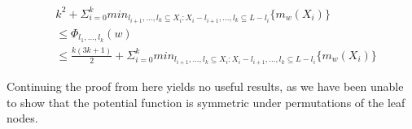 \begin{equation*}
    \begin{split}
        &k^2 + \Sigma_{i=0}^k min_{l_{i+1}, ..., l_k \subseteq X_i : X_i - l_{i+1}, ..., l_k \subseteq L - l_i} \{ m_w(X_i)\} \\
        &\leq \Phi_{l_1, ..., l_k} (w)  \\
        &\leq \frac{k(3k+1)}{2} + \Sigma_{i=0}^k min_{l_{i+1}, ..., l_k \subseteq X_i : X_i - l_{i+1}, ..., l_k \subseteq L - l_i} \{ m_w(X_i)\}
    \end{split}
\end{equation*}

Continuing the proof from here yields no useful results, as we have been unable to show that the potential function is symmetric under permutations of the leaf nodes.